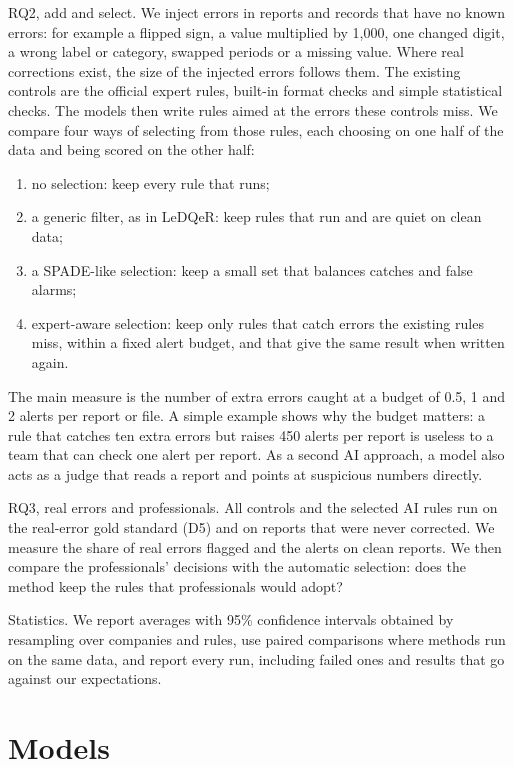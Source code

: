 \documentclass[11pt,a4paper]{article}
\begin{document}
RQ2, add and select. We inject errors in reports and records that have no known errors: for example a flipped sign, a value multiplied by 1{,}000, one changed digit, a wrong label or category, swapped periods or a missing value. Where real corrections exist, the size of the injected errors follows them. The existing controls are the official expert rules, built-in format checks and simple statistical checks. The models then write rules aimed at the errors these controls miss. We compare four ways of selecting from those rules, each choosing on one half of the data and being scored on the other half:
\begin{enumerate}
\item no selection: keep every rule that runs;
\item a generic filter, as in LeDQeR: keep rules that run and are quiet on clean data;
\item a SPADE-like selection: keep a small set that balances catches and false alarms;
\item expert-aware selection: keep only rules that catch errors the existing rules miss, within a fixed alert budget, and that give the same result when written again.
\end{enumerate}
The main measure is the number of extra errors caught at a budget of 0.5, 1 and 2 alerts per report or file. A simple example shows why the budget matters: a rule that catches ten extra errors but raises 450 alerts per report is useless to a team that can check one alert per report. As a second AI approach, a model also acts as a judge that reads a report and points at suspicious numbers directly.

RQ3, real errors and professionals. All controls and the selected AI rules run on the real-error gold standard (D5) and on reports that were never corrected. We measure the share of real errors flagged and the alerts on clean reports. We then compare the professionals' decisions with the automatic selection: does the method keep the rules that professionals would adopt?

Statistics. We report averages with 95\% confidence intervals obtained by resampling over companies and rules, use paired comparisons where methods run on the same data, and report every run, including failed ones and results that go against our expectations.

\section{Models}
\end{document}
